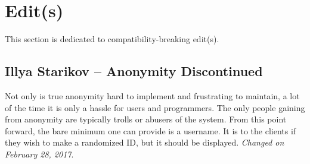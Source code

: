 \documentclass[oneside,12pt]{scrbook}
\begin{document}
\chapter{Edit(s)}
This section is dedicated to compatibility-breaking edit(s).

\section*{Illya Starikov -- Anonymity Discontinued}
Not only is true anonymity hard to implement and frustrating to maintain, a lot of the time it is only a hassle for users and programmers. The only people gaining from anonymity are typically trolls or abusers of the system. From this point forward, the bare minimum one can provide is a username. It is to the clients if they wish to make a randomized ID, but it should be displayed. \textit{Changed on February 28, 2017}.
\end{document}
